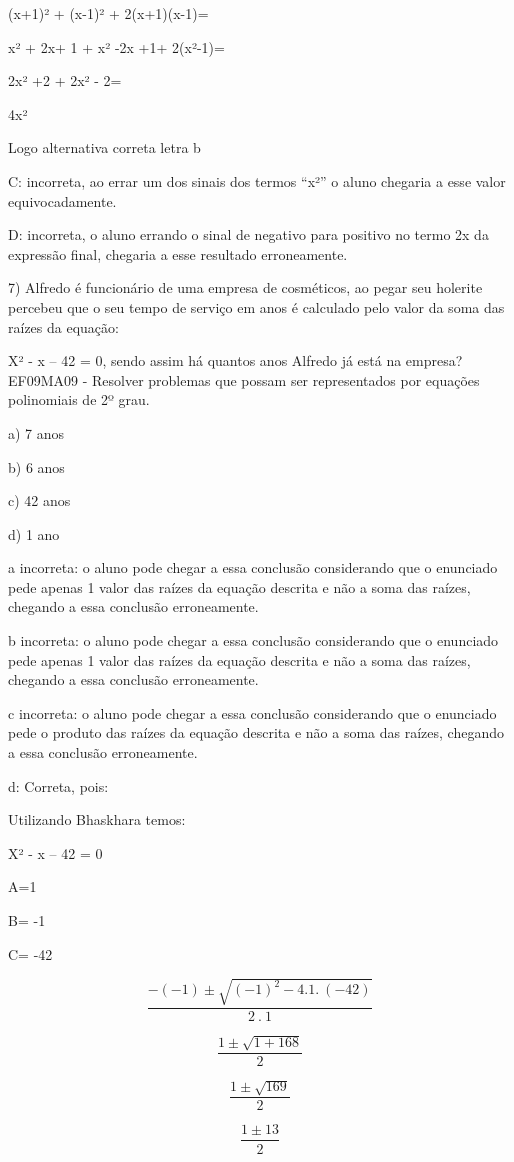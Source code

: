 (x+1)² + (x-1)² + 2(x+1)(x-1)=

x² + 2x+ 1 + x² -2x +1+ 2(x²-1)=

2x² +2 + 2x² - 2=

4x²

Logo alternativa correta letra b

C: incorreta, ao errar um dos sinais dos termos ``x²'' o aluno chegaria
a esse valor equivocadamente.

D: incorreta, o aluno errando o sinal de negativo para positivo no termo
2x da expressão final, chegaria a esse resultado erroneamente.

7) Alfredo é funcionário de uma empresa de cosméticos, ao pegar seu
holerite percebeu que o seu tempo de serviço em anos é calculado pelo
valor da soma das raízes da equação:

X² - x -- 42 = 0, sendo assim há quantos anos Alfredo já está na
empresa? EF09MA09 - Resolver problemas que possam ser representados por
equações polinomiais de 2º grau.

a) 7 anos

b) 6 anos

c) 42 anos

d) 1 ano

a incorreta: o aluno pode chegar a essa conclusão considerando que o
enunciado pede apenas 1 valor das raízes da equação descrita e não a
soma das raízes, chegando a essa conclusão erroneamente.

b incorreta: o aluno pode chegar a essa conclusão considerando que o
enunciado pede apenas 1 valor das raízes da equação descrita e não a
soma das raízes, chegando a essa conclusão erroneamente.

c incorreta: o aluno pode chegar a essa conclusão considerando que o
enunciado pede o produto das raízes da equação descrita e não a soma das
raízes, chegando a essa conclusão erroneamente.

d: Correta, pois:

Utilizando Bhaskhara temos:

X² - x -- 42 = 0

A=1

B= -1

C= -42

\[\frac{- ( - 1) \pm \sqrt{{( - 1)}^{2} - 4.1.\ ( - 42)}}{2\ .\ 1}\]

\[\frac{1 \pm \sqrt{1 + 168}}{2}\]

\[\frac{1 \pm \sqrt{169}}{2}\]

\[\frac{1 \pm 13}{2}\]

